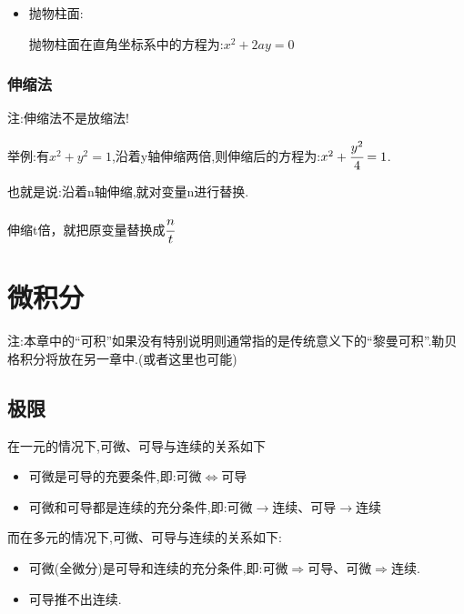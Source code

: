 \documentclass[UTF8,12pt]{ctexbook}
\begin{document}
{{{{\begin{itemize}
{\begin{itemize}
{                      双曲柱面在直角坐标系中的方程为:$\cfrac{x^2}{a^2} - \cfrac{y^2}{b^2} = 1$
                      }
                \item {
                      抛物柱面:

                      抛物柱面在直角坐标系中的方程为:$x^2 + 2ay = 0$
                      }
              \end{itemize}
              }
      \end{itemize}
    }%

    \subsubsection{伸缩法}{
      注:伸缩法不是放缩法!

      举例:有$x^2 + y^2 = 1$,沿着y轴伸缩两倍,则伸缩后的方程为:$x^2 + \cfrac{y^2}{4} = 1$.

      也就是说:沿着n轴伸缩,就对变量n进行替换.

      伸缩t倍，就把原变量替换成$\cfrac{n}{t}$
    }%
  }%

 }%

\section{微积分}{
注:本章中的“可积”如果没有特别说明则通常指的是传统意义下的“黎曼可积”.勒贝格积分将放在另一章中.(或者这里也可能)

\subsection{极限}{

  在一元的情况下,可微、可导与连续的关系如下

  \begin{itemize}
    \item 可微是可导的充要条件,即:可微$\Leftrightarrow$可导
    \item 可微和可导都是连续的充分条件,即:可微$\rightarrow$连续、可导$\rightarrow$连续
  \end{itemize}

  而在多元的情况下,可微、可导与连续的关系如下:

  \begin{itemize}
    \item 可微(全微分)是可导和连续的充分条件,即:可微$\Rightarrow$可导、可微$\Rightarrow$连续.
    \item 可导推不出连续.
  \end{itemize}

}}}
\end{document}
